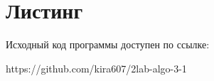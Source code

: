 \section*{Листинг}

Исходный код программы доступен по ссылке: 

https://github.com/kira607/2lab-algo-3-1